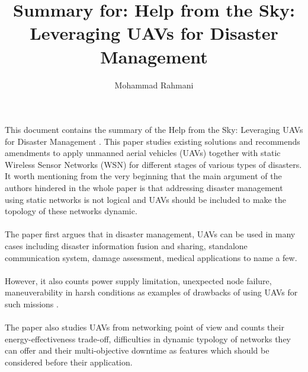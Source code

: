 \documentclass{article}
\begin{document}
	
	\title{Summary for: Help from the Sky: Leveraging UAVs for Disaster Management}
	\author{Mohammad Rahmani}
	\date{}
	\maketitle
	
	\paragraph{} This document contains the summary of the Help from the Sky: Leveraging UAVs for Disaster Management \cite{erdelj-2017-summary-for-help-from-the-sky-leveraging-uavs-for-disaster-management}. This paper studies existing solutions and recommends amendments to apply unmanned aerial vehicles (UAVs) together with static Wireless Sensor Networks (WSN) for different stages of various types of disasters. It worth mentioning from the very beginning that the main argument of the authors hindered in the whole paper is that addressing disaster management using static networks is not logical and UAVs should be included to make the topology of these networks dynamic. 
	
	\paragraph{} The paper first argues that in disaster management,  UAVs can be used in many cases including disaster information fusion and sharing,  standalone communication system, damage assessment, medical applications to name a few\cite{camara-2014-cavalry-to-the-rescue-drones-fleet-to-help-rescuers-operations-over-disasters-scenarios}. 
	
	\paragraph{} However, it also counts power supply limitation, 
	unexpected node failure, maneuverability in harsh conditions as examples of drawbacks of using UAVs for such missions \cite{chen-2013-natural-disaster-monitoring-with-wireless-sensor-networks-a-case-study-of-data-intensive-applications-upon-low-cost-scalable-systems}. 
	
	\paragraph{} The paper also studies UAVs from networking point of view and counts their energy-effectiveness trade-off, difficulties in dynamic typology of networks they can offer and their multi-objective downtime as features which should be considered before their application. 
	
\end{document}
